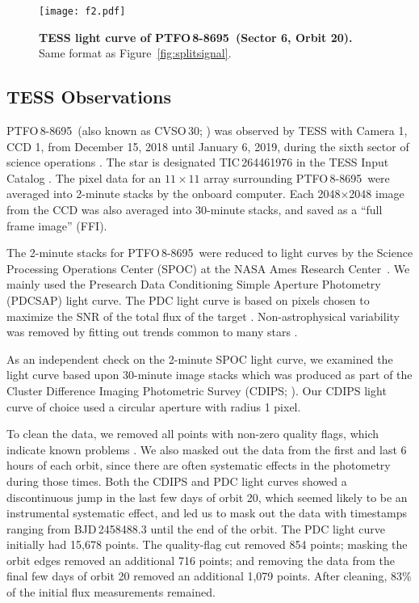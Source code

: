 \documentclass[12pt,twocolumn,tighten,trackchanges]{aastex62}
\newcommand{\ptfo}{PTFO$\,$8-8695}
\begin{document}
\begin{figure}[hbtp]
	\begin{center}
		\leavevmode
		\texttt{[image: f2.pdf]}
	\end{center}
	\vspace{-0.7cm}
  \caption{ {\bf TESS light curve of \ptfo\ (Sector 6, Orbit 20).}
  Same format as Figure~\ref{fig:splitsignal}.
  \label{fig:splitsignalii}
	}
\end{figure}

\subsection{TESS Observations}

\ptfo\ (also known as CVSO\,30; \citealt{briceno_cida_2005}) was
observed by TESS with Camera 1, CCD 1, from December 15, 2018 until
January 6, 2019, during the sixth sector of science operations
\citep{ricker_transiting_2015}.  The star is designated TIC\,264461976
in the TESS Input Catalog \citep{stassun_TIC_2018,stassun_TIC8_2019}.
The pixel data for an $11\times11$ array surrounding \ptfo\ were
averaged into 2-minute stacks by the onboard computer.  Each
2048$\times$2048 image from the CCD was also averaged into 30-minute
stacks, and saved as a ``full frame image'' (FFI).

The 2-minute stacks for \ptfo\ were reduced to light curves by the
Science Processing Operations Center (SPOC) at the NASA Ames Research
Center~\citep{jenkins_tess_2016}.  We mainly used the Presearch Data
Conditioning Simple Aperture Photometry (PDCSAP) light curve.  The PDC
light curve is based on pixels chosen to maximize the SNR of the total
flux of the target \citep{bryson_2020_target_aperture}.
Non-astrophysical variability was removed by fitting out trends common
to many stars \citep{smith_kepler_2012,stumpe_multiscale_2014}.

As an independent check on the 2-minute SPOC light curve, we examined
the light curve based upon 30-minute image stacks which was produced
as part of the Cluster Difference Imaging Photometric Survey (CDIPS;
\citealt{bouma_cluster_2019}).  Our CDIPS light curve of choice used a
circular aperture with radius 1 pixel.

To clean the data, we removed all points with non-zero quality flags,
which indicate known problems \citep[{\it
e.g.},][]{tess_data_product_description_2018}.  We also masked out the
data from the first and last 6 hours of each orbit, since there are
often systematic effects in the photometry during those times.  Both
the CDIPS and PDC light curves showed a discontinuous jump in the last
few days of orbit 20, which seemed likely to be an instrumental
systematic effect, and led us to mask out the data with timestamps
ranging from BJD\,2458488.3 until the end of the orbit.  The PDC light
curve initially had 15{,}678 points.  The quality-flag cut removed 854
points; masking the orbit edges removed an additional 716 points; and
removing the data from the final few days of orbit 20 removed an
additional 1{,}079 points.  After cleaning, 83\% of the initial flux
measurements remained.
\end{document}
